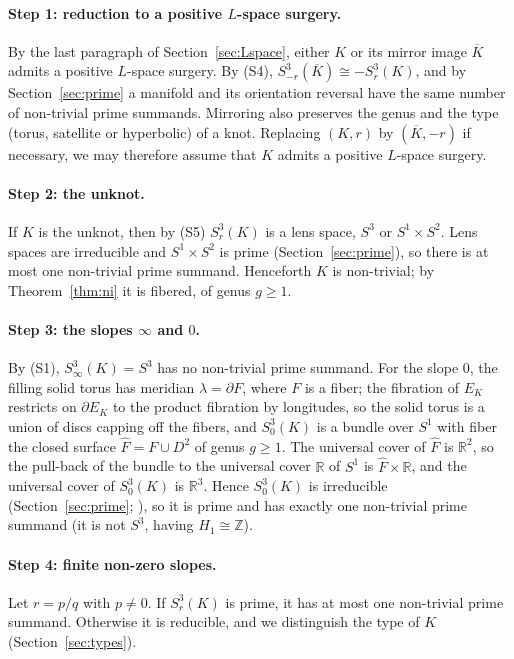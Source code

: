 \documentclass[11pt]{article}
\newcommand{\Z}{\mathbb Z}
\newcommand{\R}{\mathbb R}
\newcommand{\Surg}[2]{S^3_{#1}(#2)}
\theoremstyle{definition}
\theoremstyle{remark}
\begin{document}
\paragraph{Step 1: reduction to a positive \(L\)-space surgery.}
By the last paragraph of Section~\ref{sec:Lspace}, either \(K\) or its
mirror image \(\overline K\) admits a positive \(L\)-space surgery. By (S4),
\(\Surg{-r}{\overline K}\cong-\Surg{r}{K}\), and by
Section~\ref{sec:prime} a manifold and its orientation reversal have the
same number of non-trivial prime summands. Mirroring also preserves the
genus and the type (torus, satellite or hyperbolic) of a knot. Replacing
\((K,r)\) by \((\overline K,-r)\) if necessary, we may therefore assume
that \(K\) admits a positive \(L\)-space surgery.

\paragraph{Step 2: the unknot.}
If \(K\) is the unknot, then by (S5) \(\Surg{r}{K}\) is a lens space,
\(S^3\) or \(S^1\times S^2\). Lens spaces are irreducible and
\(S^1\times S^2\) is prime (Section~\ref{sec:prime}), so there is at most
one non-trivial prime summand. Henceforth \(K\) is non-trivial; by
Theorem~\ref{thm:ni} it is fibered, of genus \(g\geq1\).

\paragraph{Step 3: the slopes \(\infty\) and \(0\).}
By (S1), \(\Surg{\infty}{K}=S^3\) has no non-trivial prime summand. For
the slope \(0\), the filling solid torus has meridian \(\lambda=\partial F\),
where \(F\) is a fiber; the fibration of \(E_K\) restricts on
\(\partial E_K\) to the product fibration by longitudes, so the solid
torus is a union of discs capping off the fibers, and \(\Surg{0}{K}\) is a
bundle over \(S^1\) with fiber the closed surface \(\widehat F=F\cup D^2\)
of genus \(g\geq1\). The universal cover of \(\widehat F\) is \(\R^2\),
so the pull-back of the bundle to the universal cover \(\R\) of \(S^1\)
is \(\widehat F\times\R\), and the universal cover of \(\Surg{0}{K}\) is
\(\R^3\). Hence \(\Surg{0}{K}\) is irreducible (Section~\ref{sec:prime};
\cite[Proposition~1.6]{Hatcher3M}), so it is prime and has exactly one
non-trivial prime summand (it is not \(S^3\), having \(H_1\cong\Z\)).

\paragraph{Step 4: finite non-zero slopes.}
Let \(r=p/q\) with \(p\neq0\). If \(\Surg{r}{K}\) is prime, it has at most
one non-trivial prime summand. Otherwise it is reducible, and we
distinguish the type of \(K\) (Section~\ref{sec:types}).
\end{document}
